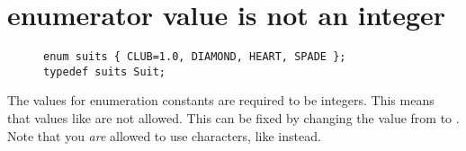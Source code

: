 \section{enumerator value is not an integer}\label{sec:enum-int-type}

\begin{figure}[htb]
\begin{lstlisting}
enum suits { CLUB=1.0, DIAMOND, HEART, SPADE };
typedef suits Suit;
\end{lstlisting}
\label{ex:enum-int-type}
\end{figure}

The values for enumeration constants are required to be integers.
This means that  values like  are not allowed.
This can be fixed by changing the value from  to .
Note that you \emph{are} allowed to use characters, like  instead.
\newpage